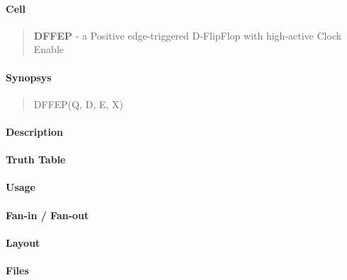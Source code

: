 \label{DFFEP}
\paragraph{Cell}
\begin{quote}
    \textbf{DFFEP} - a Positive edge-triggered D-FlipFlop with high-active Clock Enable
\end{quote}

\paragraph{Synopsys}
\begin{quote}
    DFFEP(Q, D, E, X)
\end{quote}

\paragraph{Description}

%

\paragraph{Truth Table}
%

\paragraph{Usage}

\paragraph{Fan-in / Fan-out}

\paragraph{Layout}

\paragraph{Files}
